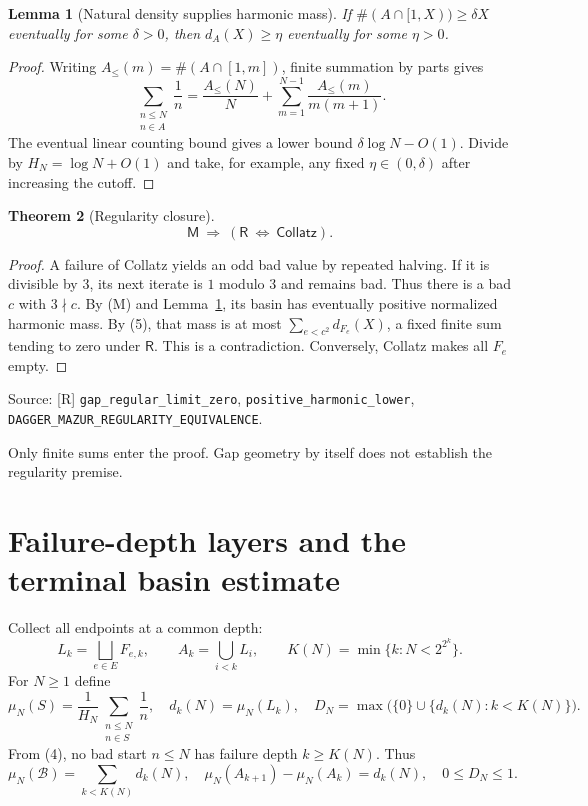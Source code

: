 \documentclass[11pt,a4paper]{article}
\newtheorem{theorem}{Theorem}[section]
\newtheorem{lemma}[theorem]{Lemma}
\theoremstyle{definition}
\newcommand{\CC}{\mathsf{Collatz}}
\newcommand{\MM}{\mathsf M}
\newcommand{\RR}{\mathsf R}
\newcommand{\Bad}{\mathcal B}
\newcommand{\source}[1]{\par{\footnotesize\color{ink}Source: #1.}\par}
\begin{document}
\begin{lemma}[Natural density supplies harmonic mass]\label{lem:density}
If $\#(A\cap[1,X))\ge\delta X$ eventually for some $\delta>0$,
then $d_A(X)\ge\eta$ eventually for some $\eta>0$.
\end{lemma}
\begin{proof}
Writing $A_{\le}(m)=\#(A\cap[1,m])$, finite summation by parts gives
\[
 \sum_{\substack{n\le N\\n\in A}}\frac1n
 =\frac{A_{\le}(N)}N+
   \sum_{m=1}^{N-1}\frac{A_{\le}(m)}{m(m+1)}.
\]
The eventual linear counting bound gives a lower bound
$\delta\log N-O(1)$. Divide by $H_N=\log N+O(1)$ and take, for example,
any fixed $\eta\in(0,\delta)$ after increasing the cutoff.
\end{proof}

\begin{theorem}[Regularity closure]
\[
 \boxed{\MM\ \Longrightarrow\ (\RR\ \Longleftrightarrow\ \CC).}
 \tag{6}
\]
\end{theorem}
\begin{proof}
A failure of Collatz yields an odd bad value by repeated halving. If it is
divisible by $3$, its next iterate is $1$ modulo $3$ and remains bad.
Thus there is a bad $c$ with $3\nmid c$.
By (M) and Lemma~\ref{lem:density}, its basin has
eventually positive normalized harmonic mass. By (5), that mass is at most
$\sum_{e<c^2}d_{F_e}(X)$, a fixed finite sum tending to zero under $\RR$.
This is a contradiction. Conversely, Collatz makes all $F_e$ empty.
\end{proof}
\source{[R] \nolinkurl{gap_regular_limit_zero},
\nolinkurl{positive_harmonic_lower},
\nolinkurl{DAGGER_MAZUR_REGULARITY_EQUIVALENCE}}
Only finite sums enter the proof. Gap geometry by itself does not establish
the regularity premise.

\newpage
\section{Failure-depth layers and the terminal basin estimate}
Collect all endpoints at a common depth:
\[
 L_k=\bigsqcup_{e\in E}F_{e,k},\qquad
 A_k=\bigcup_{i<k}L_i,\qquad
 K(N)=\min\{k:N<2^{2^k}\}.
\]
For $N\ge1$ define
\[
 \mu_N(S)=\frac1{H_N}\sum_{\substack{n\le N\\n\in S}}\frac1n,\quad
 d_k(N)=\mu_N(L_k),\quad
 D_N=\max\bigl(\{0\}\cup\{d_k(N):k<K(N)\}\bigr).
\]
From (4), no bad start $n\le N$ has failure depth $k\ge K(N)$.
Thus
\[
 \mu_N(\Bad)=\sum_{k<K(N)}d_k(N),\quad
 \mu_N(A_{k+1})-\mu_N(A_k)=d_k(N),\quad 0\le D_N\le1.
 \tag{7}
\]
\end{document}
